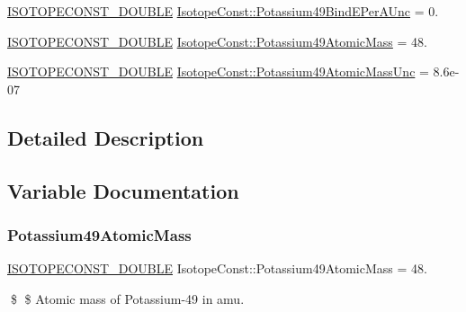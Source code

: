 \begin{DoxyCompactItemize}
\mbox{\hyperlink{group___isotope_const-_macros_ga8f45a7272ce02c0b4c65c44636ed719a}{I\+S\+O\+T\+O\+P\+E\+C\+O\+N\+S\+T\+\_\+\+D\+O\+U\+B\+LE}} \mbox{\hyperlink{group___isotope_const-_potassium-_k49_ga1086c8de27e02d2a916a2c655ebd18fc}{Isotope\+Const\+::\+Potassium49\+Bind\+E\+Per\+A\+Unc}} = 0.
\item 
\mbox{\hyperlink{group___isotope_const-_macros_ga8f45a7272ce02c0b4c65c44636ed719a}{I\+S\+O\+T\+O\+P\+E\+C\+O\+N\+S\+T\+\_\+\+D\+O\+U\+B\+LE}} \mbox{\hyperlink{group___isotope_const-_potassium-_k49_ga0d657a995193decc017e3a9868ea107b}{Isotope\+Const\+::\+Potassium49\+Atomic\+Mass}} = 48.
\item 
\mbox{\hyperlink{group___isotope_const-_macros_ga8f45a7272ce02c0b4c65c44636ed719a}{I\+S\+O\+T\+O\+P\+E\+C\+O\+N\+S\+T\+\_\+\+D\+O\+U\+B\+LE}} \mbox{\hyperlink{group___isotope_const-_potassium-_k49_gaa5df8867d461eaccde942f41c9c8cde4}{Isotope\+Const\+::\+Potassium49\+Atomic\+Mass\+Unc}} = 8.\+6e-\/07
\end{DoxyCompactItemize}


\subsection{Detailed Description}


\subsection{Variable Documentation}
\mbox{\label{group___isotope_const-_potassium-_k49_ga0d657a995193decc017e3a9868ea107b}} 
\subsubsection{\texorpdfstring{Potassium49\+Atomic\+Mass}{Potassium49AtomicMass}}
{\footnotesize\ttfamily \mbox{\hyperlink{group___isotope_const-_macros_ga8f45a7272ce02c0b4c65c44636ed719a}{I\+S\+O\+T\+O\+P\+E\+C\+O\+N\+S\+T\+\_\+\+D\+O\+U\+B\+LE}} Isotope\+Const\+::\+Potassium49\+Atomic\+Mass = 48.}

\$ \$ Atomic mass of Potassium-\/49 in amu. \mbox{\label{group___isotope_const-_potassium-_k49_gaa5df8867d461eaccde942f41c9c8cde4}} 
